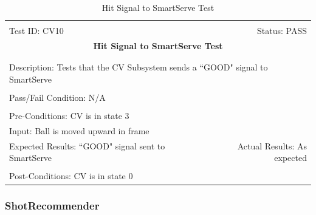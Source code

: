 \documentclass[11pt]{article}
\begin{document}
\begin{center}
\begin{table}[H]
\begin{tabular}{|l r|}\hline&\\[-2mm]
	Test ID: CV10	&Status: PASS\\[-3mm]
	\multicolumn{2}{|c|}{\textbf{\large{Hit Signal to SmartServe Test}}}\\&\\\hline&\\[-3mm]
	\multicolumn{2}{|p{\textwidth}|}{Description: Tests that the CV Subsystem sends a ``GOOD" signal to SmartServe}\\[1mm]\hline&\\[-3mm]
	\multicolumn{2}{|p{\textwidth}|}{Pass/Fail Condition: N/A}\\[1mm]\hline&\\[-3mm]
	\multicolumn{2}{|p{\textwidth}|}{Pre-Conditions: CV is in state 3}\\[4mm]
	\multicolumn{2}{|p{\textwidth}|}{Input: Ball is moved upward in frame}\\[2mm]\hline
	\multicolumn{1}{|p{0.49\textwidth}}{Expected Results: ``GOOD" signal sent to SmartServe}	&\multicolumn{1}{|p{0.45\textwidth}|}{Actual Results: As expected}\\\hline&\\[-3mm]
	\multicolumn{2}{|p{\textwidth}|}{Post-Conditions: CV is in state 0}\\\hline
\end{tabular}
\caption{Hit Signal to SmartServe Test}
\end{table}
\end{center}

\subsubsection{ShotRecommender}
\end{document}
